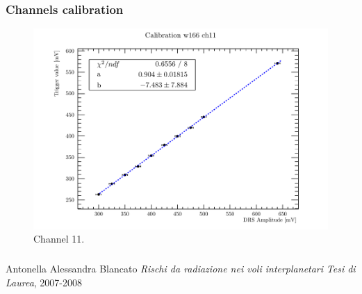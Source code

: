 \documentclass[9pt]{beamer}
\begin{document}

\begin{frame} [fragile]
\small
	\frametitle{Channels calibration}
    		\begin{figure}
		 \centering
			\includegraphics[scale=0.5]{figures/ch11.pdf}
			\caption{Channel 11.}
		\end{figure}  
\end{frame}



	

\begin{frame}
\frametitle{\refname}
   \begin{thebibliography}{9}
   \small
   

       Antonella Alessandra Blancato
      \newblock \textit{Rischi da radiazione nei voli interplanetari}
      \newblock \emph{Tesi di Laurea}, 2007-2008
      

   \end{thebibliography}
\end{frame}
\end{document}
